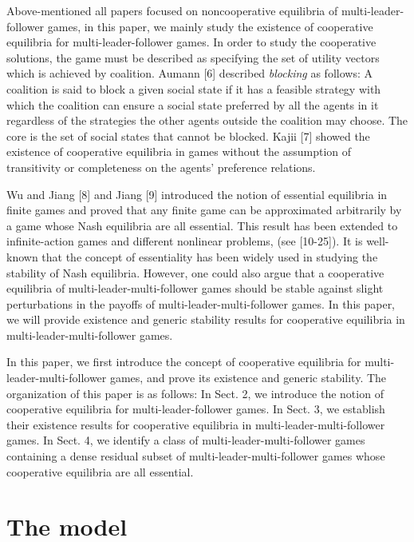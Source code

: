 Above-mentioned all papers focused on noncooperative equilibria of multi-leader-follower games,
in this paper, we mainly study the existence of cooperative equilibria for multi-leader-follower games.
In order to study the cooperative solutions, the game must be
described as specifying the set of utility vectors which is achieved by coalition.
Aumann [6] described {\it blocking} as follows: A coalition is said to block a given social state if
it has a feasible strategy with which the coalition can ensure a
social state preferred by all the agents in it regardless of the
strategies the other agents outside the coalition may choose. The
core is the set of social states that cannot be
blocked. Kajii [7] showed the existence of cooperative equilibria
in games without the assumption of transitivity or completeness
on the agents' preference relations.

Wu and Jiang [8] and Jiang [9] introduced the notion of essential equilibria
in finite games and proved that any finite game can be approximated arbitrarily
by a game whose Nash equilibria are all essential.
This result has been extended to infinite-action games and
different nonlinear problems, (see [10-25]).
It is well-known that the concept of essentiality has been widely used
in studying the stability of Nash equilibria. However, 
one could also argue that a cooperative equilibria of 
multi-leader-multi-follower games should be stable
against slight perturbations in the payoffs of 
multi-leader-multi-follower games. In this paper,
we will provide existence and generic stability results 
for cooperative equilibria in multi-leader-multi-follower games.




In this paper, we first introduce the concept of
cooperative equilibria for multi-leader-multi-follower games,
and prove its existence and generic stability.
The organization of this paper is as follows: In Sect. 2, we introduce
the notion of cooperative equilibria for multi-leader-follower games.
In Sect. 3, we establish their existence results for cooperative equilibria in multi-leader-multi-follower games.
In Sect. 4, we identify a class of multi-leader-multi-follower games containing a dense residual subset of multi-leader-multi-follower games whose cooperative equilibria are all essential.

\section{The model}

